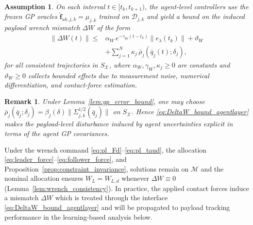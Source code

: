 \documentclass[letterpaper, 10 pt, conference]{ieeeconf}  %
\newcommand{\0}{\matr{0}}
\newtheorem{assumption}{Assumption}
\newtheorem{remark}{Remark}
\begin{document}

\begin{assumption}
\label{ass:agent_layer_iss}
On each interval $t\in[t_k,t_{k+1})$, the agent-level controllers use the frozen GP
oracles $\hat{\mathbf f}_{uk,j,k}=\mu_{j,k}$ trained on $\mathcal D_{j,k}$ and yield a bound
on the induced payload wrench mismatch $\Delta W$ of the form
\begin{align}
\|\Delta W(t)\|
\le&
\alpha_W\,e^{-\gamma_W(t-t_k)}\|e_\lambda(t_k)\|
+\vartheta_W\nonumber\\
&+\sum_{j=1}^N \kappa_{j}\,\bar\rho_j(\bar q_j(t);\delta_j),
\label{eq:DeltaW_bound_agentlayer}
\end{align}
for all consistent trajectories in $S_{\mathcal X}$, where $\alpha_W,\gamma_W,\kappa_j\ge 0$ are constants and
$\vartheta_W\ge 0$ collects bounded effects due to measurement noise, numerical differentiation, and contact-force estimation.
\end{assumption}

\begin{remark}
Under Lemma~\ref{lem:gp_error_bound}, one may choose
$\bar\rho_j(\bar q_j;\delta_j)=\beta_j(\delta)\|\Sigma_{j,k}^{1/2}(\bar q_j)\|$ on $S_{\mathcal X}$.
Hence \eqref{eq:DeltaW_bound_agentlayer} makes the payload-level disturbance induced by
agent uncertainties explicit in terms of the agent GP covariances.
\end{remark}

Under the wrench command \eqref{eq:pl_Fd}--\eqref{eq:pl_taud},
the allocation \eqref{eq:leader_force}--\eqref{eq:follower_force}, and Proposition~\ref{prop:constraint_invariance},
solutions remain on $\mathcal M$ and the nominal allocation ensures $W_L=W_{L,d}$ whenever $\Delta W\equiv 0$
(Lemma~\ref{lem:wrench_consistency}). In practice, the applied contact forces induce a mismatch $\Delta W$ which is treated through the interface \eqref{eq:DeltaW_bound_agentlayer} and will be
propagated to payload tracking performance in the learning-based analysis below.
\end{document}
